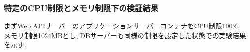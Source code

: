 \documentclass[../../../../main]{subfiles}
\begin{document}
    \subsubsection{特定のCPU制限とメモリ制限下の検証結果}\label{subsubsec:result-streaming-only-limit}

    まずWeb APIサーバーのアプリケーションサーバーコンテナをCPU制限100\%, メモリ制限1024MBとし, DBサーバーも同様の制限を設定した状態での実験結果を示す.

    

    

    

    

    
\end{document}
